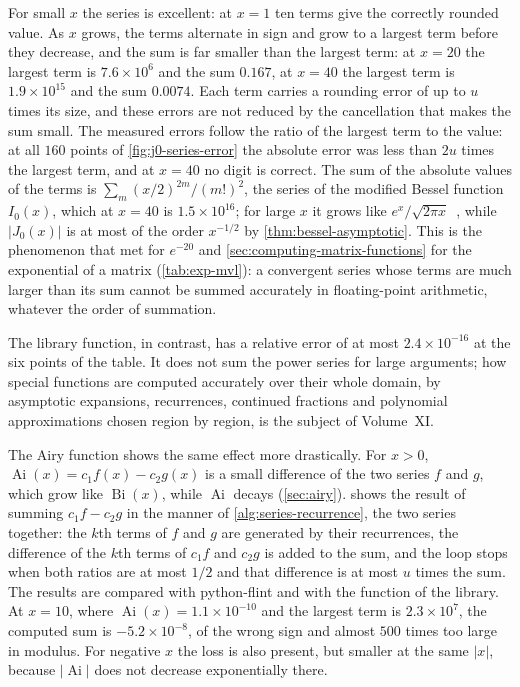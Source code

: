 For small $x$ the series is excellent: at $x=1$ ten terms give the correctly rounded value. As $x$ grows, the terms alternate in sign and grow to a largest term before they decrease, and the sum is far smaller than the largest term: at $x=20$ the largest term is $7.6\times10^6$ and the sum $0.167$, at $x=40$ the largest term is $1.9\times10^{15}$ and the sum $0.0074$. Each term carries a rounding error of up to $u$ times its size, and these errors are not reduced by the cancellation that makes the sum small. The measured errors follow the ratio of the largest term to the value: at all $160$ points of \cref{fig:j0-series-error} the absolute error was less than $2u$ times the largest term, and at $x=40$ no digit is correct. The sum of the absolute values of the terms is $\sum_m(x/2)^{2m}/(m!)^2$, the series of the modified Bessel function $I_0(x)$, which at $x=40$ is $1.5\times10^{16}$; for large $x$ it grows like $e^x/\sqrt{2\pi x}$~\cite[Sect.~10.40]{olver2010nist}, while $|J_0(x)|$ is at most of the order $x^{-1/2}$ by \cref{thm:bessel-asymptotic}. This is the phenomenon that  met for $e^{-20}$ and \cref{sec:computing-matrix-functions} for the exponential of a matrix (\cref{tab:exp-mvl}): a convergent series whose terms are much larger than its sum cannot be summed accurately in floating-point arithmetic, whatever the order of summation.

The library function, in contrast, has a relative error of at most $2.4\times10^{-16}$ at the six points of the table. It does not sum the power series for large arguments; how special functions are computed accurately over their whole domain, by asymptotic expansions, recurrences, continued fractions and polynomial approximations chosen region by region, is the subject of Volume~XI.

The Airy function shows the same effect more drastically. For $x>0$, $\operatorname{Ai}(x)=c_1f(x)-c_2g(x)$ is a small difference of the two series $f$ and $g$, which grow like $\operatorname{Bi}(x)$, while $\operatorname{Ai}$ decays (\cref{sec:airy}).  shows the result of summing $c_1f-c_2g$ in the manner of \cref{alg:series-recurrence}, the two series together: the $k$th terms of $f$ and $g$ are generated by their recurrences, the difference of the $k$th terms of $c_1f$ and $c_2g$ is added to the sum, and the loop stops when both ratios are at most $1/2$ and that difference is at most $u$ times the sum. The results are compared with python-flint and with the function  of the library. At $x=10$, where $\operatorname{Ai}(x)=1.1\times10^{-10}$ and the largest term is $2.3\times10^7$, the computed sum is $-5.2\times10^{-8}$, of the wrong sign and almost $500$ times too large in modulus. For negative $x$ the loss is also present, but smaller at the same $|x|$, because $|\operatorname{Ai}|$ does not decrease exponentially there.

